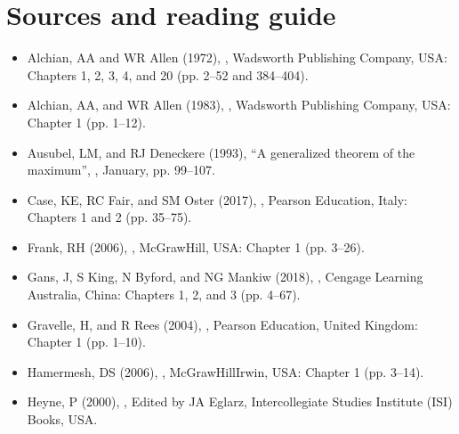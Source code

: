 \documentclass[letterpaper,10pt,english]{jupyterBook}
\begin{document}
\section{Sources and reading guide}
\label{\detokenize{01.intro_to_economics:sources-and-reading-guide}}\begin{itemize}
\item {} 
\sphinxAtStartPar
Alchian, AA and WR Allen (1972), , Wadsworth Publishing Company, USA: Chapters 1, 2, 3, 4, and 20 (pp. 2–52 and 384–404).

\item {} 
\sphinxAtStartPar
Alchian, AA, and WR Allen (1983), , Wadsworth Publishing Company, USA: Chapter 1 (pp. 1–12).

\item {} 
\sphinxAtStartPar
Ausubel, LM, and RJ Deneckere (1993), “A generalized theorem of the maximum”, , January, pp. 99–107.

\item {} 
\sphinxAtStartPar
Case, KE, RC Fair, and SM Oster (2017), , Pearson Education, Italy: Chapters 1 and 2 (pp. 35–75).

\item {} 
\sphinxAtStartPar
Frank, RH (2006), , McGraw\sphinxhyphen{}Hill, USA: Chapter 1 (pp. 3–26).

\item {} 
\sphinxAtStartPar
Gans, J, S King, N Byford, and NG Mankiw (2018), , Cengage Learning Australia, China: Chapters 1, 2, and 3 (pp. 4–67).

\item {} 
\sphinxAtStartPar
Gravelle, H, and R Rees (2004), , Pearson Education, United Kingdom: Chapter 1 (pp. 1–10).

\item {} 
\sphinxAtStartPar
Hamermesh, DS (2006), , McGraw\sphinxhyphen{}Hill\sphinxhyphen{}Irwin, USA: Chapter 1 (pp. 3–14).

\item {} 
\sphinxAtStartPar
Heyne, P (2000), , Edited by JA Eglarz, Intercollegiate Studies Institute (ISI) Books, USA.


\end{itemize}
\end{document}
